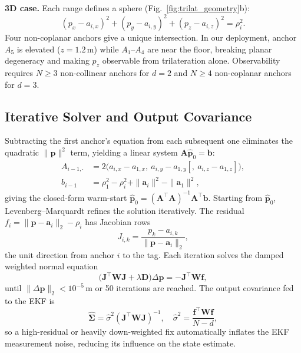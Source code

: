 \textbf{3D case.}
Each range defines a sphere (Fig.~\ref{fig:trilat_geometry}b):
\begin{equation}
  (p_x - a_{i,x})^2 + (p_y - a_{i,y})^2 + (p_z - a_{i,z})^2 = \rho_i^2.
  \label{eq:spheres}
\end{equation}
Four non-coplanar anchors give a unique intersection.
In our deployment, anchor $A_5$ is elevated ($z = 1.2$\,m) while
$A_1$--$A_4$ are near the floor, breaking planar degeneracy and making
$p_z$ observable from trilateration alone.
Observability requires $N \geq 3$ non-collinear anchors for $d=2$
and $N \geq 4$ non-coplanar anchors for $d=3$.

\subsection{Iterative Solver and Output Covariance}
\label{sec:lm_derivation}

Subtracting the first anchor's equation from each subsequent one
eliminates the quadratic $\|\mathbf{p}\|^2$ term, yielding a linear
system $\mathbf{A}\hat{\mathbf{p}}_0 = \mathbf{b}$:
\begin{align}
  A_{i-1,\cdot} &= 2\bigl(a_{i,x}-a_{1,x},\ a_{i,y}-a_{1,y}
    [,\ a_{i,z}-a_{1,z}]\bigr), \label{eq:lin_A}\\
  b_{i-1} &= \rho_1^2 - \rho_i^2 + \|\mathbf{a}_i\|^2
    - \|\mathbf{a}_1\|^2, \label{eq:lin_b}
\end{align}
giving the closed-form warm-start
$\hat{\mathbf{p}}_0 = (\mathbf{A}^\top\mathbf{A})^{-1}\mathbf{A}^\top\mathbf{b}$.
Starting from $\hat{\mathbf{p}}_0$, Levenberg--Marquardt refines the
solution iteratively.
The residual $f_i = \|\mathbf{p}-\mathbf{a}_i\|_2 - \rho_i$ has
Jacobian rows
\begin{equation}
  J_{i,k} = \frac{p_k - a_{i,k}}{\|\mathbf{p}-\mathbf{a}_i\|_2},
  \label{eq:jacobian}
\end{equation}
the unit direction from anchor $i$ to the tag.
Each iteration solves the damped weighted normal equation
\begin{equation}
  \bigl(\mathbf{J}^\top\mathbf{W}\mathbf{J} + \lambda\mathbf{D}\bigr)
  \Delta\mathbf{p} = -\mathbf{J}^\top\mathbf{W}\mathbf{f},
  \label{eq:lm_step}
\end{equation}
until $\|\Delta\mathbf{p}\|_2 < 10^{-5}$\,m or 50 iterations are reached.
The output covariance fed to the EKF is
\begin{equation}
  \hat{\boldsymbol{\Sigma}} = \hat{\sigma}^2
    (\mathbf{J}^\top\mathbf{W}\mathbf{J})^{-1}, \quad
  \hat{\sigma}^2 = \frac{\mathbf{f}^\top\mathbf{W}\mathbf{f}}{N-d},
  \label{eq:lm_cov}
\end{equation}
so a high-residual or heavily down-weighted fix automatically inflates
the EKF measurement noise, reducing its influence on the state estimate.

